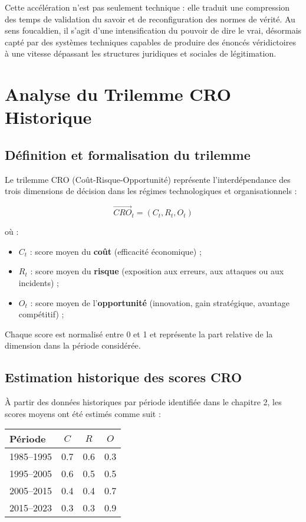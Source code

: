 \documentclass[12pt, a4em]{article}
\begin{document}
	Cette accélération n’est pas seulement technique : elle traduit une compression des temps de validation du savoir et de reconfiguration des normes de vérité.  
	Au sens foucaldien, il s’agit d’une intensification du pouvoir de dire le vrai, désormais capté par des systèmes techniques capables de produire des énoncés véridictoires à une vitesse dépassant les structures juridiques et sociales de légitimation.
	
	
	\section{Analyse du Trilemme CRO Historique}
	
	\subsection{ Définition et formalisation du trilemme}
	
	Le trilemme CRO (Coût-Risque-Opportunité) représente l’interdépendance des trois dimensions de décision dans les régimes technologiques et organisationnels :
	
	\[
	\vec{CRO}_t = (C_t, R_t, O_t)
	\]
	
	où :
	\begin{itemize}
		\item $C_t$ : score moyen du \textbf{coût} (efficacité économique) ;
		\item $R_t$ : score moyen du \textbf{risque} (exposition aux erreurs, aux attaques ou aux incidents) ;
		\item $O_t$ : score moyen de l’\textbf{opportunité} (innovation, gain stratégique, avantage compétitif) ;
	\end{itemize}
	
	Chaque score est normalisé entre 0 et 1 et représente la part relative de la dimension dans la période considérée.
	
	\subsection{ Estimation historique des scores CRO}
	
	À partir des données historiques par période identifiée dans le chapitre 2, les scores moyens ont été estimés comme suit :
	
	\begin{center}
		\begin{tabular}{lccc}
			\toprule
			\textbf{Période} & $C$ & $R$ & $O$ \\
			\midrule
			1985--1995 & 0.7 & 0.6 & 0.3 \\
			1995--2005 & 0.6 & 0.5 & 0.5 \\
			2005--2015 & 0.4 & 0.4 & 0.7 \\
			2015--2023 & 0.3 & 0.3 & 0.9 \\
			\bottomrule
		\end{tabular}
	\end{center}
	
\end{document}
